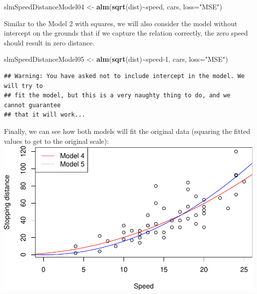 \documentclass[
]{book}
\newenvironment{Shaded}{\begin{snugshade}}{\end{snugshade}}
\newcommand{\DataTypeTok}[1]{\textcolor[rgb]{0.13,0.29,0.53}{#1}}
\newcommand{\DecValTok}[1]{\textcolor[rgb]{0.00,0.00,0.81}{#1}}
\newcommand{\KeywordTok}[1]{\textcolor[rgb]{0.13,0.29,0.53}{\textbf{#1}}}
\newcommand{\NormalTok}[1]{#1}
\newcommand{\OperatorTok}[1]{\textcolor[rgb]{0.81,0.36,0.00}{\textbf{#1}}}
\newcommand{\StringTok}[1]{\textcolor[rgb]{0.31,0.60,0.02}{#1}}
\theoremstyle{definition}
\theoremstyle{definition}
\theoremstyle{definition}
\theoremstyle{definition}
\theoremstyle{remark}
\begin{document}
\begin{Shaded}
\begin{Highlighting}[]
\NormalTok{slmSpeedDistanceModel04 \textless{}{-}}\StringTok{ }\KeywordTok{alm}\NormalTok{(}\KeywordTok{sqrt}\NormalTok{(dist)}\OperatorTok{\textasciitilde{}}\NormalTok{speed, cars, }\DataTypeTok{loss=}\StringTok{"MSE"}\NormalTok{)}
\end{Highlighting}
\end{Shaded}

Similar to the Model 2 with squares, we will also consider the model without intercept on the grounds that if we capture the relation correctly, the zero speed should result in zero distance.

\begin{Shaded}
\begin{Highlighting}[]
\NormalTok{slmSpeedDistanceModel05 \textless{}{-}}\StringTok{ }\KeywordTok{alm}\NormalTok{(}\KeywordTok{sqrt}\NormalTok{(dist)}\OperatorTok{\textasciitilde{}}\NormalTok{speed}\DecValTok{{-}1}\NormalTok{, cars, }\DataTypeTok{loss=}\StringTok{"MSE"}\NormalTok{)}
\end{Highlighting}
\end{Shaded}

\begin{verbatim}
## Warning: You have asked not to include intercept in the model. We will try to
## fit the model, but this is a very naughty thing to do, and we cannot guarantee
## that it will work...
\end{verbatim}

Finally, we can see how both models will fit the original data (squaring the fitted values to get to the original scale):
\includegraphics{Svetunkov---Statistics-for-Business-Analytics_files/figure-latex/speedDistanceSqrt02-1.pdf}
\end{document}
